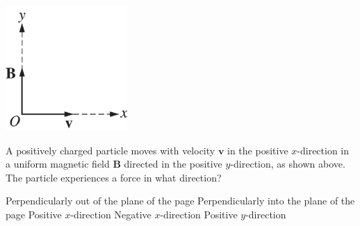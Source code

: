 \begin{center}
\includegraphics[scale=0.5]{images/img-002-004.png}
\end{center}

\begin{questions}\setcounter{question}{4}\question
A positively charged particle moves with velocity $\mathbf{v}$ in the positive $x$-direction in a uniform magnetic field $\mathbf{B}$ directed in the positive $y$-direction, as shown above. The particle experiences a force in what direction?

\begin{choices}
\choice Perpendicularly out of the plane of the page
\choice Perpendicularly into the plane of the page
\choice Positive $x$-direction
\choice Negative $x$-direction
\choice Positive $y$-direction
\end{choices}\end{questions}

